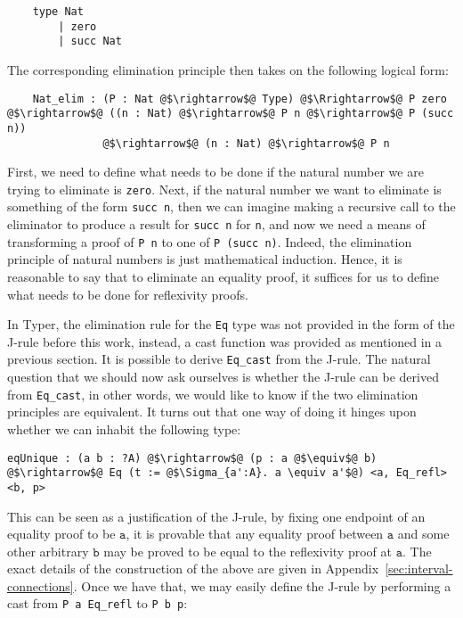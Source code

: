 \documentclass[12pt,twoside,maitrise]{dms}
\theoremstyle{definition}
\numberwithin{equation}{section}
\numberwithin{table}{chapter}
\numberwithin{figure}{chapter}
\newcommand\id[1] {\texttt{#1}}
\newcommand\fn[1] {\texttt{#1}}
\begin{document}
\begin{verbatim}
    type Nat
        | zero
        | succ Nat
\end{verbatim}

The corresponding elimination principle then takes on the following logical form:

\begin{verbatim}
    Nat_elim : (P : Nat @$\rightarrow$@ Type) @$\Rrightarrow$@ P zero @$\rightarrow$@ ((n : Nat) @$\rightarrow$@ P n @$\rightarrow$@ P (succ n))
               @$\rightarrow$@ (n : Nat) @$\rightarrow$@ P n
\end{verbatim}

First, we need to define what needs to be done if the natural number we are
trying to eliminate is \id{zero}. Next, if the natural number we want to
eliminate is something of the form \fn{succ n}, then we can imagine making a
recursive call to the eliminator to produce a result for \fn{succ n} for \id{n},
and now we need a means of transforming a proof of \fn{P n} to one of \fn{P
  (succ n)}. Indeed, the elimination principle of natural numbers is just
mathematical induction. Hence, it is reasonable to say that to eliminate an
equality proof, it suffices for us to define what needs to be done for
reflexivity proofs.

In Typer, the elimination rule for the \id{Eq} type was not provided in the form
of the J-rule before this work, instead, a cast function was provided as
mentioned in a previous section. It is possible to derive \id{Eq\_cast} from the
J-rule. The natural question that we should now ask ourselves is whether the
J-rule can be derived from \id{Eq\_cast}, in other words, we would like to know
if the two elimination principles are equivalent. It turns out that one way of
doing it hinges upon whether we can inhabit the following type:

\begin{verbatim}
eqUnique : (a b : ?A) @$\rightarrow$@ (p : a @$\equiv$@ b) @$\rightarrow$@ Eq (t := @$\Sigma_{a':A}. a \equiv a'$@) <a, Eq_refl>  <b, p>
\end{verbatim}

This can be seen as a justification of the J-rule, by fixing one endpoint of an
equality proof to be $\fn{a}$, it is provable that any equality proof between
$\fn{a}$ and some other arbitrary $\fn{b}$ may be proved to be equal to the
reflexivity proof at $\fn{a}$. The exact details of the construction of the
above are given in Appendix~\ref{sec:interval-connections}. Once we have that,
we may easily define the J-rule by performing a cast from \fn{P a Eq\_refl} to
\fn{P b p}:
\end{document}
